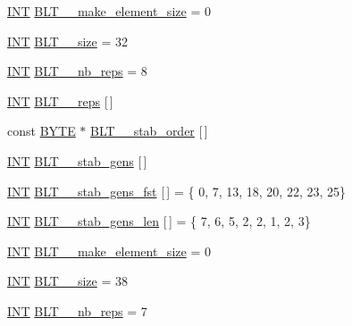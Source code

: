 \begin{DoxyCompactItemize}
\mbox{\hyperlink{galois_8h_a09fddde158a3a20bd2dcadb609de11dc}{I\+NT}} \mbox{\hyperlink{data___b_l_t_8_c_a7fc571453caf852d58dd43164dc075a4}{B\+L\+T\+\_\+\_\+make\+\_\+element\+\_\+size}} = 0
\item 
\mbox{\hyperlink{galois_8h_a09fddde158a3a20bd2dcadb609de11dc}{I\+NT}} \mbox{\hyperlink{data___b_l_t_8_c_adb99d6cf8f61fb2fca00870e678fc7dc}{B\+L\+T\+\_\+\_\+size}} = 32
\item 
\mbox{\hyperlink{galois_8h_a09fddde158a3a20bd2dcadb609de11dc}{I\+NT}} \mbox{\hyperlink{data___b_l_t_8_c_a8da20e2d4440d6609c055c7db0eaee06}{B\+L\+T\+\_\+\_\+nb\+\_\+reps}} = 8
\item 
\mbox{\hyperlink{galois_8h_a09fddde158a3a20bd2dcadb609de11dc}{I\+NT}} \mbox{\hyperlink{data___b_l_t_8_c_ad749e76f78003536f91bc5025129ffeb}{B\+L\+T\+\_\+\_\+reps}} \mbox{[}$\,$\mbox{]}
\item 
const \mbox{\hyperlink{galois_8h_ab6cc7b4aeb6ea31aba2b3fbfc83ff5e6}{B\+Y\+TE}} $\ast$ \mbox{\hyperlink{data___b_l_t_8_c_ac4e37dfa9977b7d47e42ab1802f0f703}{B\+L\+T\+\_\+\_\+stab\+\_\+order}} \mbox{[}$\,$\mbox{]}
\item 
\mbox{\hyperlink{galois_8h_a09fddde158a3a20bd2dcadb609de11dc}{I\+NT}} \mbox{\hyperlink{data___b_l_t_8_c_ab59c688ca406a9f7e87108d44b5527fd}{B\+L\+T\+\_\+\_\+stab\+\_\+gens}} \mbox{[}$\,$\mbox{]}
\item 
\mbox{\hyperlink{galois_8h_a09fddde158a3a20bd2dcadb609de11dc}{I\+NT}} \mbox{\hyperlink{data___b_l_t_8_c_a14378ae1a523bf9ef604fe75985d0ba2}{B\+L\+T\+\_\+\_\+stab\+\_\+gens\+\_\+fst}} \mbox{[}$\,$\mbox{]} = \{ 0, 7, 13, 18, 20, 22, 23, 25\}
\item 
\mbox{\hyperlink{galois_8h_a09fddde158a3a20bd2dcadb609de11dc}{I\+NT}} \mbox{\hyperlink{data___b_l_t_8_c_a939b59c30bd05f4532e1e958e846117b}{B\+L\+T\+\_\+\_\+stab\+\_\+gens\+\_\+len}} \mbox{[}$\,$\mbox{]} = \{ 7, 6, 5, 2, 2, 1, 2, 3\}
\item 
\mbox{\hyperlink{galois_8h_a09fddde158a3a20bd2dcadb609de11dc}{I\+NT}} \mbox{\hyperlink{data___b_l_t_8_c_ad35c96522791126ef784cc1a2518a208}{B\+L\+T\+\_\+\_\+make\+\_\+element\+\_\+size}} = 0
\item 
\mbox{\hyperlink{galois_8h_a09fddde158a3a20bd2dcadb609de11dc}{I\+NT}} \mbox{\hyperlink{data___b_l_t_8_c_ac7300fadbff6aed7a3848f0bb0aafed1}{B\+L\+T\+\_\+\_\+size}} = 38
\item 
\mbox{\hyperlink{galois_8h_a09fddde158a3a20bd2dcadb609de11dc}{I\+NT}} \mbox{\hyperlink{data___b_l_t_8_c_ad096e706400817839f188378039e01c9}{B\+L\+T\+\_\+\_\+nb\+\_\+reps}} = 7

\end{DoxyCompactItemize}
